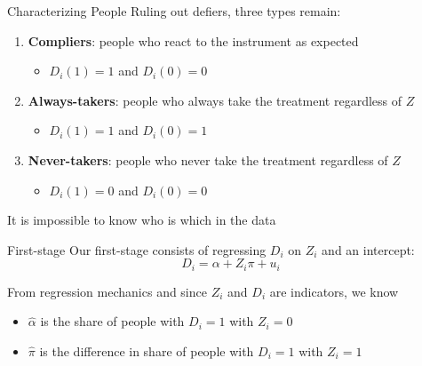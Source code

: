 \documentclass[aspectratio=169,t,11pt,table]{beamer}
\begin{document}
\begin{frame}{Characterizing People}
  Ruling out defiers, three types remain:
  \begin{enumerate}
    \item \textbf{Compliers}: people who react to the instrument as expected
    \begin{itemize}
      \item $D_{i}(1) = 1$ and $D_{i}(0) = 0$
    \end{itemize} 

    \item \textbf{Always-takers}: people who always take the treatment regardless of $Z$
    \begin{itemize}
      \item $D_{i}(1) = 1$ and $D_{i}(0) = 1$
    \end{itemize}

    \item \textbf{Never-takers}: people who never take the treatment regardless of $Z$
    \begin{itemize}
      \item $D_{i}(1) = 0$ and $D_{i}(0) = 0$
    \end{itemize}
  \end{enumerate}

  \bigskip
  It is impossible to know who is which in the data
\end{frame}

\begin{frame}{First-stage}
  Our first-stage consists of regressing $D_i$ on $Z_i$ and an intercept:
  $$
    D_i = \alpha + Z_i \pi + u_i
  $$

  \bigskip
  From regression mechanics and since $Z_i$ and $D_i$ are indicators, we know
  \begin{itemize}
    \item $\hat{\alpha}$ is the share of people with $D_i = 1$ with $Z_i = 0$
    
    \item $\hat{\pi}$ is the difference in share of people with $D_i = 1$ with $Z_i = 1$
  \end{itemize}
\end{frame}
\end{document}
